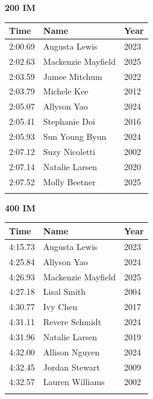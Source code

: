 \vspace{1.2em}
\noindent\begin{minipage}[t]{0.48\textwidth}
\centering
\textbf{\textcolor{teamprimary}{200 IM}}\par
\vspace{0.5em}
\centering
\small
\renewcommand{\arraystretch}{1.0}
\setlength{\tabcolsep}{4pt}
\begin{tabular}{@{}p{1.8cm}p{3.0cm}p{1.0cm}@{}}
\toprule
\textbf{Time} & \textbf{Name} & \textbf{Year} \\
\midrule
2:00.69 & Augusta Lewis & 2023 \\
2:02.63 & Mackenzie Mayfield & 2025 \\
2:03.59 & Jamee Mitchum & 2022 \\
2:03.79 & Michele Kee & 2012 \\
2:05.07 & Allyson Yao & 2024 \\
2:05.41 & Stephanie Doi & 2016 \\
2:05.93 & Sun Young Byun & 2024 \\
2:07.12 & Suzy Nicoletti & 2002 \\
2:07.14 & Natalie Larsen & 2020 \\
2:07.52 & Molly Beetner & 2025 \\
\bottomrule
\vspace{0.5em}
\end{tabular}
\end{minipage}
\hfill
\begin{minipage}[t]{0.48\textwidth}
\centering
\textbf{\textcolor{teamprimary}{400 IM}}\par
\vspace{0.5em}
\centering
\small
\renewcommand{\arraystretch}{1.0}
\setlength{\tabcolsep}{4pt}
\begin{tabular}{@{}p{1.8cm}p{3.0cm}p{1.0cm}@{}}
\toprule
\textbf{Time} & \textbf{Name} & \textbf{Year} \\
\midrule
4:15.73 & Augusta Lewis & 2023 \\
4:25.84 & Allyson Yao & 2024 \\
4:26.93 & Mackenzie Mayfield & 2025 \\
4:27.18 & Lisal Smith & 2004 \\
4:30.77 & Ivy Chen & 2017 \\
4:31.11 & Revere Schmidt & 2024 \\
4:31.96 & Natalie Larsen & 2019 \\
4:32.00 & Allison Nguyen & 2024 \\
4:32.45 & Jordan Stewart & 2009 \\
4:32.57 & Lauren Williams & 2002 \\
\bottomrule
\vspace{0.5em}
\end{tabular}
\end{minipage}
